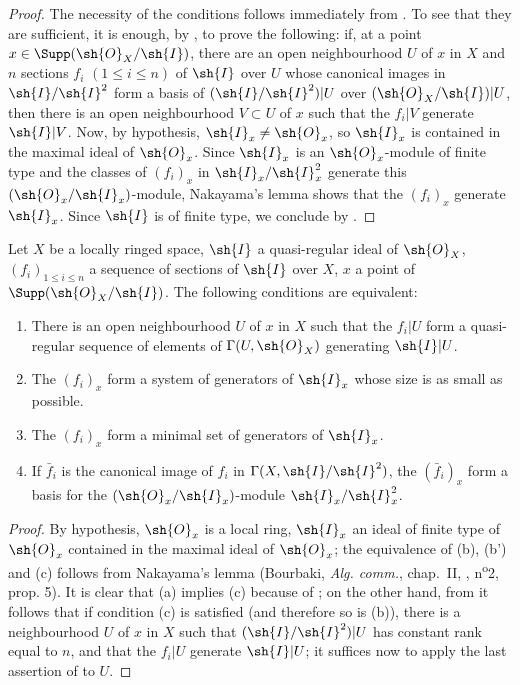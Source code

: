 \begin{proof}
The necessity of the conditions follows immediately from .
To see that they are sufficient, it is enough, by , to prove the following: if, at a point $x \in \Supp(\sh{O}_X/\sh{I})$, there are an open neighbourhood $U$ of $x$ in $X$ and $n$ sections $f_i$ $(1 \leq i \leq n)$ of $\sh{I}$ over $U$ whose canonical images in $\sh{I}/\sh{I}^2$ form a basis of $(\sh{I}/\sh{I}^2)|U$ over $(\sh{O}_X/\sh{I})|U$, then there is an open neighbourhood $V \subset U$ of $x$ such that the $f_i|V$ generate $\sh{I}|V$.
Now, by hypothesis, $\sh{I}_x \neq \sh{O}_x$, so $\sh{I}_x$ is contained in the maximal ideal of $\sh{O}_x$.
Since $\sh{I}_x$ is an $\sh{O}_x$-module of finite type and the classes of $(f_i)_x$ in $\sh{I}_x/\sh{I}_x^2$ generate this $(\sh{O}_x/\sh{I}_x)$-module, Nakayama's lemma shows that the $(f_i)_x$ generate $\sh{I}_x$.
Since $\sh{I}$ is of finite type, we conclude by .
\end{proof} 

\begin{corollary}[16.9.5]
\label{IV.16.9.5}
Let $X$ be a locally ringed space, $\sh{I}$ a quasi-regular ideal of $\sh{O}_X$, $(f_i)_{1 \leq i \leq n}$ a sequence of sections of $\sh{I}$ over $X$, $x$ a point of $\Supp(\sh{O}_X/\sh{I})$. 
The following conditions are equivalent:
\begin{enumerate}
  \item[(a)] There is an open neighbourhood $U$ of $x$ in $X$ such that the $f_i|U$ form a quasi-regular sequence of elements of $\Gamma(U, \sh{O}_X)$ generating $\sh{I}|U$.
  \item[(b)] The $(f_i)_x$ form a system of generators of $\sh{I}_x$ whose size is as small as possible.
  \item[(b')] The $(f_i)_x$ form a minimal set of generators of $\sh{I}_x$.
  \item[(c)] If $\bar f_i$ is the canonical image of $f_i$ in $\Gamma(X, \sh{I}/\sh{I}^2)$, the $(\bar f_i)_x$ form a basis for the $(\sh{O}_x/\sh{I}_x)$-module $\sh{I}_x/\sh{I}_x^2$.
\end{enumerate}
\end{corollary}

\begin{proof}
By hypothesis, $\sh{O}_x$ is a local ring, $\sh{I}_x$ an ideal of finite type of $\sh{O}_x$ contained in the maximal ideal of $\sh{O}_x$;
the equivalence of (b), (b') and (c) follows from Nakayama's lemma (Bourbaki, \emph{Alg. comm.}, chap.~II, , n\textsuperscript{o}2, prop. 5).
It is clear that (a) implies (c) because of ;
on the other hand, from  it follows that if condition (c) is satisfied (and therefore so is (b)), there is a neighbourhood $U$ of $x$ in $X$ such that $(\sh{I}/\sh{I}^2)|U$ has constant rank equal to $n$, and that the $f_i|U$ generate $\sh{I}|U$;
  it suffices now to apply the last assertion of  to $U$.
\end{proof}

